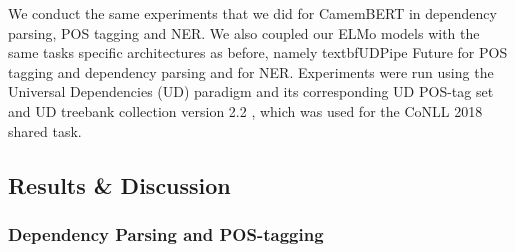 We conduct the same experiments that we did for CamemBERT in dependency parsing, POS tagging and NER. We also coupled our ELMo models with the same tasks specific architectures as before, namely textbf{UDPipe Future} \citep{straka-2018-udpipe} for POS tagging and dependency parsing and \citep{strakova-etal-2019-neural} for NER. Experiments were run using the Universal Dependencies (UD) paradigm and its corresponding UD POS-tag set \citep{petrov-etal-2012-universal} and UD treebank collection version 2.2 \citep{nivre-etal-2018-universal}, which was used for the CoNLL 2018 shared task.

\subsection{Results \& Discussion} \label{sect:ResultsCorpora}

\subsubsection{Dependency Parsing and POS-tagging}\label{sect:ResultsParsePOS}

